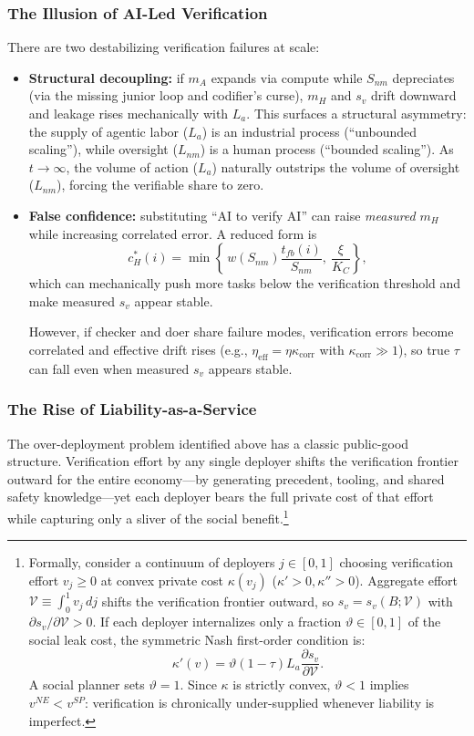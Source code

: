 \documentclass[12pt, letter]{article}
\begin{document}
\subsubsection{The Illusion of AI-Led Verification}

There are two destabilizing verification failures at scale:

\begin{itemize}
    \item \textbf{Structural decoupling:} if $m_A$ expands via compute while $S_{nm}$ depreciates (via the missing junior loop and codifier's curse), $m_H$ and $s_v$ drift downward and leakage rises mechanically with $L_a$. This surfaces a structural asymmetry: the supply of agentic labor ($L_a$) is an industrial process (``unbounded scaling''), while oversight ($L_{nm}$) is a human process (``bounded scaling''). As $t \to \infty$, the volume of action ($L_a$) naturally outstrips the volume of oversight ($L_{nm}$), forcing the verifiable share to zero.
    \item \textbf{False confidence:} substituting ``AI to verify AI'' can raise \emph{measured} $m_H$ while increasing correlated error. A reduced form is
\[
c_H^\ast(i)=\min\left\{\,w(S_{nm})\frac{t_{fb}(i)}{S_{nm}},\ \frac{\xi}{K_C}\right\},
\]
which can mechanically push more tasks below the verification threshold and make measured $s_v$ appear stable. 

However, if checker and doer share failure modes, verification errors become correlated and effective drift rises (e.g., $\eta_{\mathrm{eff}}=\eta\kappa_{\mathrm{corr}}$ with $\kappa_{\mathrm{corr}}\gg 1$), so true $\tau$ can fall even when measured $s_v$ appears stable.
\end{itemize}



\subsubsection{The Rise of Liability-as-a-Service}

The over-deployment problem identified above has a classic public-good structure. Verification effort by any single deployer shifts the verification frontier outward for the entire economy---by generating precedent, tooling, and shared safety knowledge---yet each deployer bears the full private cost of that effort while capturing only a sliver of the social benefit.\footnote{Formally, consider a continuum of deployers $j\in[0,1]$ choosing verification effort $v_j\ge 0$ at convex private cost $\kappa(v_j)$ ($\kappa'>0,\kappa''>0$). Aggregate effort $\mathcal{V}\equiv\int_0^1 v_j\,dj$ shifts the verification frontier outward, so $s_v=s_v(B;\mathcal{V})$ with $\partial s_v/\partial\mathcal{V}>0$. If each deployer internalizes only a fraction $\vartheta\in[0,1]$ of the social leak cost, the symmetric Nash first-order condition is:
\[
\kappa'(v) = \vartheta(1-\tau)L_a\frac{\partial s_v}{\partial\mathcal{V}}.
\]
A social planner sets $\vartheta=1$. Since $\kappa$ is strictly convex, $\vartheta<1$ implies $v^{NE}<v^{SP}$: verification is chronically under-supplied whenever liability is imperfect.}
\end{document}
